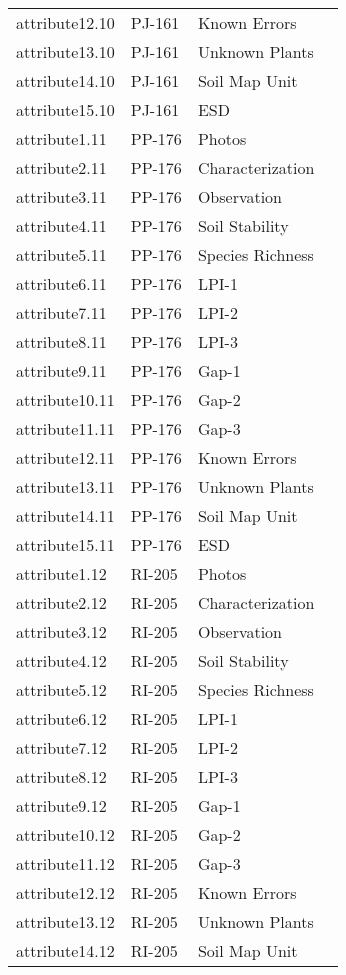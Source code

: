\documentclass[
]{article}
\begin{document}
\begin{longtable}[]{@{}llll@{}}
attribute12.10 & PJ-161 & Known Errors & \\
attribute13.10 & PJ-161 & Unknown Plants & \\
attribute14.10 & PJ-161 & Soil Map Unit & \\
attribute15.10 & PJ-161 & ESD & \\
attribute1.11 & PP-176 & Photos & \\
attribute2.11 & PP-176 & Characterization & \\
attribute3.11 & PP-176 & Observation & \\
attribute4.11 & PP-176 & Soil Stability & \\
attribute5.11 & PP-176 & Species Richness & \\
attribute6.11 & PP-176 & LPI-1 & \\
attribute7.11 & PP-176 & LPI-2 & \\
attribute8.11 & PP-176 & LPI-3 & \\
attribute9.11 & PP-176 & Gap-1 & \\
attribute10.11 & PP-176 & Gap-2 & \\
attribute11.11 & PP-176 & Gap-3 & \\
attribute12.11 & PP-176 & Known Errors & \\
attribute13.11 & PP-176 & Unknown Plants & \\
attribute14.11 & PP-176 & Soil Map Unit & \\
attribute15.11 & PP-176 & ESD & \\
attribute1.12 & RI-205 & Photos & \\
attribute2.12 & RI-205 & Characterization & \\
attribute3.12 & RI-205 & Observation & \\
attribute4.12 & RI-205 & Soil Stability & \\
attribute5.12 & RI-205 & Species Richness & \\
attribute6.12 & RI-205 & LPI-1 & \\
attribute7.12 & RI-205 & LPI-2 & \\
attribute8.12 & RI-205 & LPI-3 & \\
attribute9.12 & RI-205 & Gap-1 & \\
attribute10.12 & RI-205 & Gap-2 & \\
attribute11.12 & RI-205 & Gap-3 & \\
attribute12.12 & RI-205 & Known Errors & \\
attribute13.12 & RI-205 & Unknown Plants & \\
attribute14.12 & RI-205 & Soil Map Unit & \\

\end{longtable}
\end{document}
